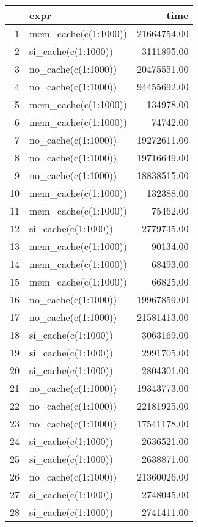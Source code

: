 \begin{table}[ht]
\centering
\begin{tabular}{rlr}
  \hline
 & expr & time \\ 
  \hline
1 & mem\_cache(c(1:1000)) & 21664754.00 \\ 
  2 & si\_cache(c(1:1000)) & 3111895.00 \\ 
  3 & no\_cache(c(1:1000)) & 20475551.00 \\ 
  4 & no\_cache(c(1:1000)) & 94455692.00 \\ 
  5 & mem\_cache(c(1:1000)) & 134978.00 \\ 
  6 & mem\_cache(c(1:1000)) & 74742.00 \\ 
  7 & no\_cache(c(1:1000)) & 19272611.00 \\ 
  8 & no\_cache(c(1:1000)) & 19716649.00 \\ 
  9 & no\_cache(c(1:1000)) & 18838515.00 \\ 
  10 & mem\_cache(c(1:1000)) & 132388.00 \\ 
  11 & mem\_cache(c(1:1000)) & 75462.00 \\ 
  12 & si\_cache(c(1:1000)) & 2779735.00 \\ 
  13 & mem\_cache(c(1:1000)) & 90134.00 \\ 
  14 & mem\_cache(c(1:1000)) & 68493.00 \\ 
  15 & mem\_cache(c(1:1000)) & 66825.00 \\ 
  16 & no\_cache(c(1:1000)) & 19967859.00 \\ 
  17 & no\_cache(c(1:1000)) & 21581413.00 \\ 
  18 & si\_cache(c(1:1000)) & 3063169.00 \\ 
  19 & si\_cache(c(1:1000)) & 2991705.00 \\ 
  20 & si\_cache(c(1:1000)) & 2804301.00 \\ 
  21 & no\_cache(c(1:1000)) & 19343773.00 \\ 
  22 & no\_cache(c(1:1000)) & 22181925.00 \\ 
  23 & no\_cache(c(1:1000)) & 17541178.00 \\ 
  24 & si\_cache(c(1:1000)) & 2636521.00 \\ 
  25 & si\_cache(c(1:1000)) & 2638871.00 \\ 
  26 & no\_cache(c(1:1000)) & 21360026.00 \\ 
  27 & si\_cache(c(1:1000)) & 2748045.00 \\ 
  28 & si\_cache(c(1:1000)) & 2741411.00 \\ 

\end{tabular}
\end{table}
